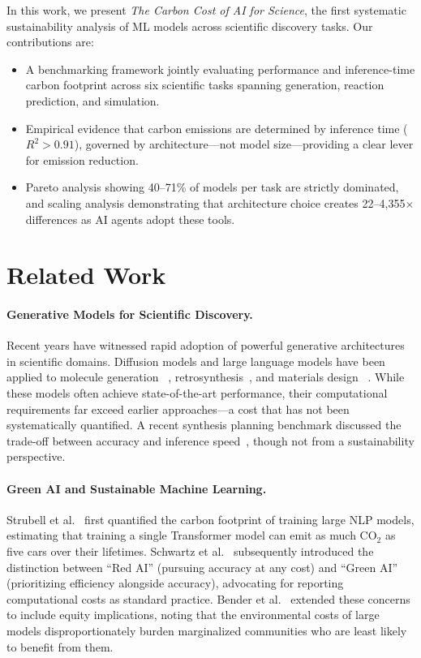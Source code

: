 \documentclass{article}
\theoremstyle{plain}
\theoremstyle{definition}
\theoremstyle{remark}
\begin{document}
In this work, we present \textit{The Carbon Cost of AI for Science}, 
the first systematic sustainability analysis of ML models across 
scientific discovery tasks. Our contributions are:
\begin{itemize}
    \item A benchmarking framework jointly evaluating performance and inference-time carbon footprint across six scientific tasks spanning generation, reaction prediction, and simulation.
    \item Empirical evidence that carbon emissions are determined by inference time ($R^2 > 0.91$), governed by architecture---not model size---providing a clear lever for emission reduction.
    \item Pareto analysis showing 40--71\% of models per task are strictly dominated, and scaling analysis demonstrating that architecture choice creates 22--4{,}355$\times$ differences as AI agents adopt these tools.
\end{itemize}

\section{Related Work}

\paragraph{Generative Models for Scientific Discovery.}
Recent years have witnessed rapid adoption of powerful generative architectures in scientific domains. Diffusion models and large language models have been applied to molecule generation ~\cite{vignac2022digress, yu2024llasmol}, retrosynthesis~\cite{igashov2023retrobridge, deng2025rsgpt}, and materials design ~\cite{xie2021crystal, jiao2023crystal, antunes2024crystal, zeni2025generative}. While these models often achieve state-of-the-art performance, their computational requirements far exceed earlier approaches---a cost that has not been systematically quantified. A recent synthesis planning benchmark discussed the trade-off between accuracy and inference speed~\cite{maziarz2025re}, though not from a sustainability perspective.

\paragraph{Green AI and Sustainable Machine Learning.}
Strubell et al.~\cite{strubell2019energy} first quantified the carbon footprint of training large NLP models, estimating that training a single Transformer model can emit as much CO$_2$ as five cars over their lifetimes. Schwartz et al.~\cite{schwartz2020green} subsequently introduced the distinction between ``Red AI'' (pursuing accuracy at any cost) and ``Green AI'' (prioritizing efficiency alongside accuracy), advocating for reporting computational costs as standard practice. Bender et al.~\cite{bender2021dangers} extended these concerns to include equity implications, noting that the environmental costs of large models disproportionately burden marginalized communities who are least likely to benefit from them.
\end{document}
